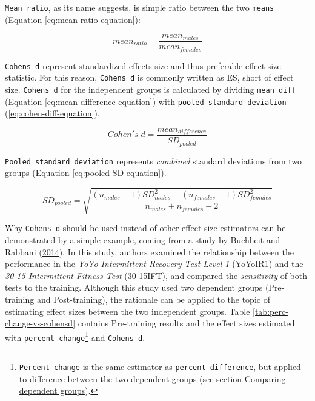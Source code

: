 \documentclass[
]{book}
\begin{document}
\texttt{Mean\ ratio}, as its name suggests, is simple ratio between the two \texttt{means} (Equation \eqref{eq:mean-ratio-equation}):

\begin{equation}
  mean_{ratio} = \frac{mean_{males}}{mean_{females}}
  \label{eq:mean-ratio-equation}
\end{equation}

\texttt{Cohen\textquotesingle{}s\ d} represent standardized effects size and thus preferable effect size statistic. For this reason, \texttt{Cohen\textquotesingle{}s\ d} is commonly written as ES, short of effect size. \texttt{Cohen\textquotesingle{}s\ d} for the independent groups is calculated by dividing \texttt{mean\ diff} (Equation \eqref{eq:mean-difference-equation}) with \texttt{pooled\ standard\ deviation} (\eqref{eq:cohen-diff-equation}).

\begin{equation}
  Cohen's\;d = \frac{mean_{difference}}{SD_{pooled}}
  \label{eq:cohen-diff-equation}
\end{equation}

\texttt{Pooled\ standard\ deviation} represents \emph{combined} standard deviations from two groups (Equation \eqref{eq:pooled-SD-equation}).

\begin{equation}
  SD_{pooled} = \sqrt{\frac{(n_{males} - 1) SD_{males}^2 + (n_{females} - 1) SD_{females}^2}{n_{males}+n_{females} - 2}}
  \label{eq:pooled-SD-equation}
\end{equation}

Why \texttt{Cohen\textquotesingle{}s\ d} should be used instead of other effect size estimators can be demonstrated by a simple example, coming from a study by Buchheit and Rabbani (\protect\hyperlink{ref-buchheit3015Intermittent2014}{2014}). In this study, authors examined the relationship between the performance in the \emph{YoYo Intermittent Recovery Test Level 1} (YoYoIR1) and the \emph{30-15 Intermittent Fitness Test} (30-15IFT), and compared the \emph{sensitivity} of both tests to the training. Although this study used two dependent groups (Pre-training and Post-training), the rationale can be applied to the topic of estimating effect sizes between the two independent groups. Table \ref{tab:perc-change-vs-cohensd} contains Pre-training results and the effect sizes estimated with \texttt{percent\ change}\footnote{\texttt{Percent\ change} is the same estimator as \texttt{percent\ difference}, but applied to difference between the two dependent groups (see section \protect\hyperlink{comparing-dependent-groups}{Comparing dependent groups}).} and \texttt{Cohen\textquotesingle{}s\ d}.
\end{document}
